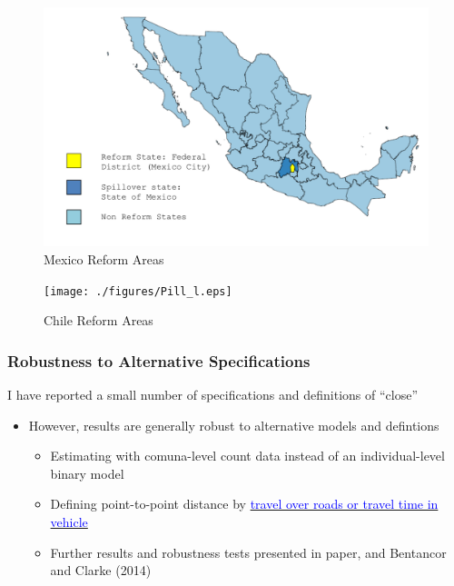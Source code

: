 \documentclass[10pt,letterpaper,subeqn]{beamer}
\begin{document}
\begin{frame}[label=MexMap]
\begin{figure}
\begin{center}
\caption{Mexico Reform Areas}
\hspace{-16mm}\includegraphics[scale=0.32]{./figures/MexReform.png}
\end{center}
\end{figure}
\end{frame}

\begin{frame}[label=ChileMap]
\begin{figure}
\begin{center}
\caption{Chile Reform Areas}
\hspace{-16mm}\texttt{[image: ./figures/Pill\_l.eps]}
\end{center}
\end{figure}
\end{frame}

\begin{frame}[label=robust]
 \frametitle{Robustness to Alternative Specifications}
I have reported a small number of specifications and definitions of ``close''
\vspace{4mm}
\begin{itemize}
\item However, results are generally robust to alternative models and defintions
\begin{itemize}
\item Estimating with comuna-level count data instead of an individual-level binary model
\item Defining point-to-point distance by \hyperlink{distance}{\textcolor{blue}{travel over roads or travel time in vehicle}}
\item Further results and robustness tests presented in paper, and Bentancor and Clarke (2014)
\end{itemize}
\end{itemize}
\end{frame}
\end{document}
